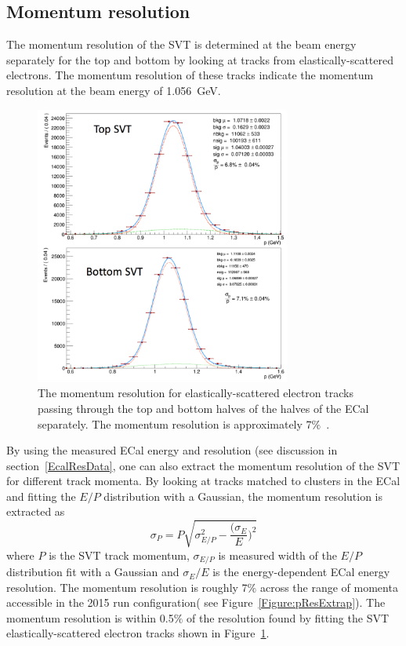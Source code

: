 \subsection{Momentum resolution}
The momentum resolution of the SVT is determined at the beam energy separately for the top and bottom by looking at tracks from elastically-scattered electrons. The momentum resolution of these tracks indicate the momentum resolution at the beam energy of 1.056~GeV. 

\begin{figure}[thb]
  \centering
      \includegraphics[width=0.75\textwidth]{pics/performance/SVTMom.png}
  \caption[Momentum resolution of the SVT]{The momentum resolution for elastically-scattered electron tracks passing through the top and bottom halves of the halves of the ECal separately. The momentum resolution is approximately 7$\%$~\cite{moreno_search_2016}.}
  \label{Figure:pRes}
\end{figure}

By using the measured ECal energy and resolution (see discussion in section~\ref{EcalResData}, one can also extract the momentum resolution of the SVT for different track momenta. By looking at tracks matched to clusters in the ECal and fitting the $E/P$ distribution with a Gaussian, the momentum resolution is extracted as
\begin{equation}
	\label{eq:pres}
	\sigma_P = P\sqrt{\sigma_{E/P}^2-\dfrac{\big(\sigma_E}{E}\big)^2} 
\end{equation}
where $P$ is the SVT track momentum, $\sigma_{E/P}$ is measured width of the $E/P$ distribution fit with a Gaussian and $\sigma_E/E$ is the energy-dependent ECal energy resolution. The momentum resolution is roughly 7$\%$ across the range of momenta accessible in the 2015 run configuration( see Figure~\ref{Figure:pResExtrap}). The momentum resolution is within 0.5$\%$ of the resolution found by fitting the SVT elastically-scattered electron tracks shown in Figure~\ref{Figure:pRes}.

